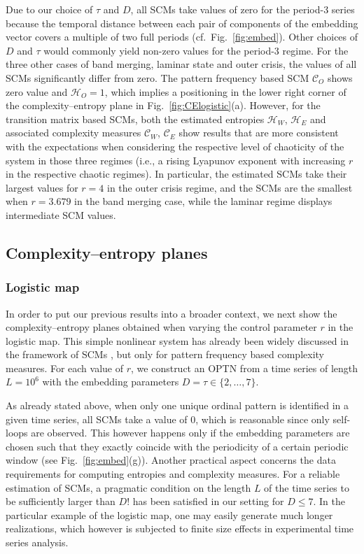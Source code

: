 \documentclass[aip,cha,reprint,nofootinbib]{revtex4-1}
\begin{document}
Due to our choice of $\tau$ and $D$, all SCMs take values of zero for the period-3 series because the temporal distance between each pair of components of the embedding vector covers a multiple of two full periods (cf.~Fig.~\ref{fig:embed}). Other choices of $D$ and $\tau$ would commonly yield non-zero values for the period-3 regime. For the three other cases of band merging, laminar state and outer crisis, the values of all SCMs significantly differ from zero. The pattern frequency based SCM $\mathcal{C}_O$ shows zero value and $\mathcal{H}_{O} = 1$, which implies a positioning in the lower right corner of the complexity--entropy plane in Fig.~\ref{fig:CElogistic}(a). However, for the transition matrix based SCMs, both the estimated entropies $\mathcal{H}_W$, $\mathcal{H}_E$ and associated complexity measures $\mathcal{C}_W$, $\mathcal{C}_E$ show results that are more consistent with the expectations when considering the respective level of chaoticity of the system in those three regimes (i.e., a rising Lyapunov exponent with increasing $r$ in the respective chaotic regimes). In particular, the estimated SCMs take their largest values for $r = 4$ in the outer crisis regime, and the SCMs are the smallest when $r = 3.679$ in the band merging case, while the laminar regime displays intermediate SCM values. 

\subsection{Complexity--entropy planes} \label{sec:plane}
\subsubsection{Logistic map} 
In order to put our previous results into a broader context, we next show the complexity--entropy planes obtained when varying the control parameter $r$ in the logistic map. This simple nonlinear system has already been widely discussed in the framework of SCMs \cite{RossoPRE2007,MartinPLA2003}, but only for pattern frequency based complexity measures. For each value of $r$, we construct an OPTN from a time series of length $L = 10 ^ 6$ with the embedding parameters $D = \tau \in \{2,\ldots,7\}$. 

As already stated above, when only one unique ordinal pattern is identified in a given time series, all SCMs take a value of $0$, which is reasonable since only self-loops are observed. This however happens only if the embedding parameters are chosen such that they exactly coincide with the periodicity of a certain periodic window (see Fig.~\ref{fig:embed}(g)). Another practical aspect concerns the data requirements for computing entropies and complexity measures. For a reliable estimation of SCMs, a pragmatic condition on the length $L$ of the time series to be sufficiently larger than $D!$ \cite{rossoPRL2007,kowalskiPhyD2007} has been satisfied in our setting for $D \leq 7$. In the particular example of the logistic map, one may easily generate much longer realizations, which however {\color{red} is subjected to finite size effects in experimental time series analysis}. 
\end{document}

